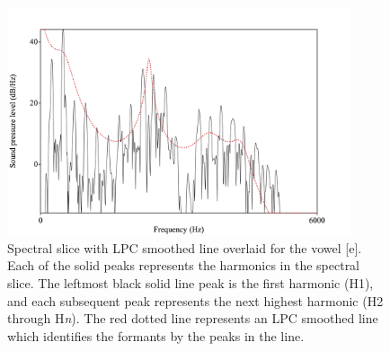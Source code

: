 \documentclass[12pt, letterpaper]{article}
\begin{document}

\begin{figure}[!h]
	\centering
	\includegraphics[width=0.9\textwidth]{Images/Harmonics.png}
	\caption{Spectral slice with LPC smoothed line overlaid for the vowel [e]. Each of the solid peaks represents the harmonics in the spectral slice. The leftmost black solid line peak is the first harmonic (H1), and each subsequent peak represents the next highest harmonic (H2 through H\textit{n}). The red dotted line represents an LPC smoothed line which identifies the formants by the peaks in the line.}
	\label{fig:Harmonics}
\end{figure}
\end{document}
